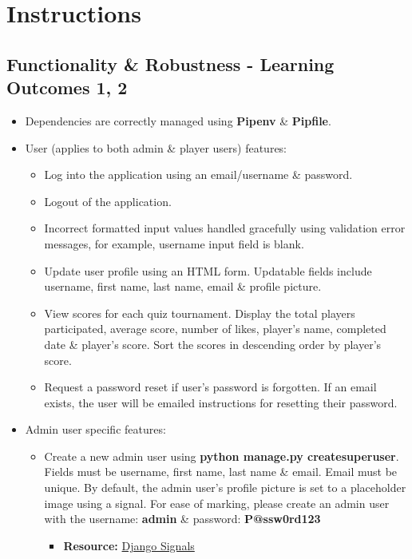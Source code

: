 \documentclass{article}
\begin{document}
\newpage

\section*{Instructions} 
\subsection*{Functionality \& Robustness - Learning Outcomes 1, 2}
\begin{itemize}
	\item Dependencies are correctly managed using \textbf{Pipenv} \& \textbf{Pipfile}.
	\item User (applies to both admin \& player users) features:
	\begin{itemize}
		\item Log into the application using an email/username \& password.
		\item Logout of the application.
		\item Incorrect formatted input values handled gracefully using validation error messages, for example, username input field is blank.
		\item Update user profile using an HTML form. Updatable fields include username, first name, last name, email \& profile picture.
		\item View scores for each quiz tournament. Display the total players participated, average score, number of likes, player's name, completed date \& player's score. Sort the scores in descending order by player’s score.
		\item Request a password reset if user's password is forgotten. If an email exists, the user will be emailed instructions for resetting their password.
	\end{itemize}
	\item Admin user specific features:
	\begin{itemize}
		\item Create a new admin user using \textbf{python manage.py createsuperuser}. Fields must be username, first name, last name \& email. Email must be unique. By default, the admin user's profile picture is set to a placeholder image using a signal. For ease of marking, please create an admin user with the username: \textbf{admin} \& password: \textbf{P@ssw0rd123}
		\begin{itemize}
			\item \textbf{Resource:} \href{https://docs.djangoproject.com/en/3.1/topics/signals}{Django Signals}
		\end{itemize}

\end{itemize}
\end{itemize}
\end{document}

